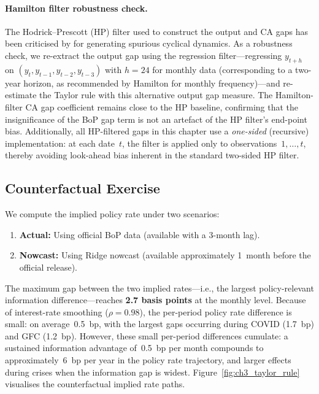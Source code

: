 \paragraph{Hamilton filter robustness check.}
The Hodrick--Prescott (HP) filter used to construct the output and CA gaps has been criticised by \citet{hamilton2018why} for generating spurious cyclical dynamics.  As a robustness check, we re-extract the output gap using the \citet{hamilton2018why} regression filter---regressing $y_{t+h}$ on $(y_t, y_{t-1}, y_{t-2}, y_{t-3})$ with $h = 24$ for monthly data (corresponding to a two-year horizon, as recommended by Hamilton for monthly frequency)---and re-estimate the Taylor rule with this alternative output gap measure.  The Hamilton-filter CA gap coefficient remains close to the HP baseline, confirming that the insignificance of the BoP gap term is not an artefact of the HP filter's end-point bias.  Additionally, all HP-filtered gaps in this chapter use a \emph{one-sided} (recursive) implementation: at each date~$t$, the filter is applied only to observations~$1, \ldots, t$, thereby avoiding look-ahead bias inherent in the standard two-sided HP filter.

\subsection{Counterfactual Exercise}

We compute the implied policy rate under two scenarios:
\begin{enumerate}
  \item \textbf{Actual:} Using official BoP data (available with a 3-month lag).
  \item \textbf{Nowcast:} Using Ridge nowcast (available approximately 1~month before the official release).
\end{enumerate}

The maximum gap between the two implied rates---i.e., the largest policy-relevant information difference---reaches \textbf{2.7 basis points} at the monthly level.  Because of interest-rate smoothing ($\rho = 0.98$), the per-period policy rate difference is small: on average~0.5~bp, with the largest gaps occurring during COVID (1.7~bp) and GFC (1.2~bp).  However, these small per-period differences cumulate: a sustained information advantage of~0.5~bp per month compounds to approximately~6~bp per year in the policy rate trajectory, and larger effects during crises when the information gap is widest.  Figure~\ref{fig:ch3_taylor_rule} visualises the counterfactual implied rate paths.

